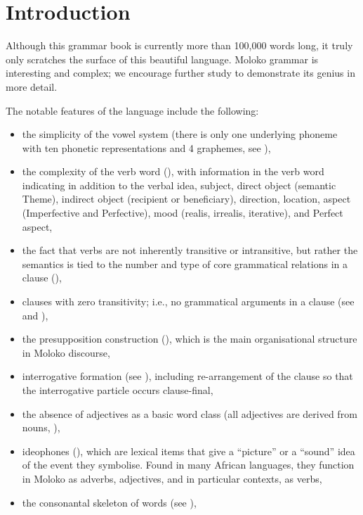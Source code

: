 \chapter[Introduction]{Introduction}\label{chap:1}\label{introduction}
\hypertarget{RefHeading1210241525720847}{}\hypertarget{Toc450584435}{}

Although this grammar book is currently more than 100,000 words long, it truly only scratches the surface of this beautiful language. Moloko grammar is interesting and complex; we encourage further study  to demonstrate its genius in more detail. 

The notable features of the language include the following:

\begin{itemize}
\item the simplicity of the vowel system (there is only one underlying phoneme with ten phonetic representations and 4 graphemes, see ), 
\item the complexity of the verb word (), with information in the verb word indicating in addition to the verbal idea, subject, direct object (semantic Theme), indirect object (recipient or beneficiary), direction, location, aspect (Imperfective and Perfective), mood (realis, irrealis, iterative), and Perfect aspect, 
\item  the fact that verbs are not inherently transitive or intransitive, but rather the semantics is tied to the number and type of core grammatical relations in a clause (), 
\item clauses with zero transitivity; i.e., no grammatical arguments in a clause (see  and ),  
\item the presupposition construction (), which is the main organisational structure in Moloko discourse, 
\item interrogative formation (see ), including re-arrangement of the clause so that the interrogative particle occurs clause-final,
\item the absence of adjectives as a basic word class (all adjectives are derived from nouns, ),
\item ideophones (), which are lexical items that give a ``picture'' or a ``sound'' idea of the event they symbolise. Found in many African languages, they function in Moloko as adverbs, adjectives, and in particular contexts, as verbs, 
\item the consonantal skeleton of words (see ), 

\end{itemize}
